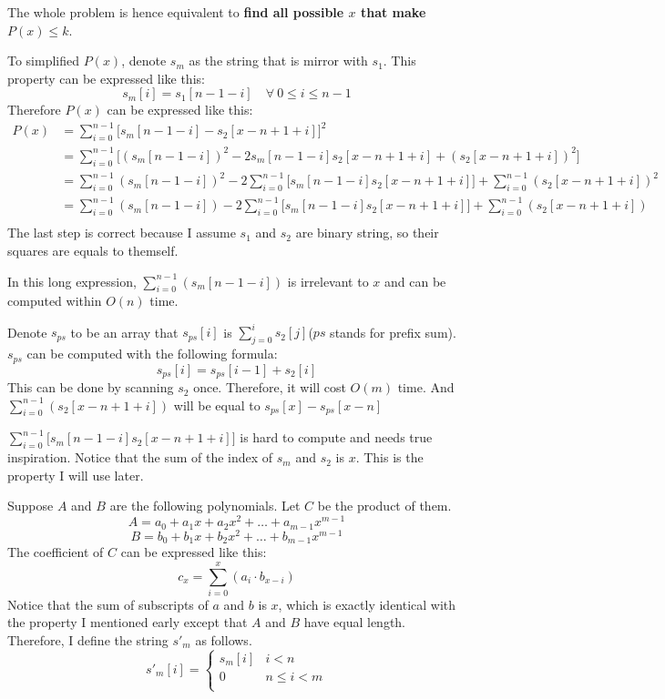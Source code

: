 \documentclass[11pt]{article}
\newenvironment{qparts}{\begin{enumerate}[{(}a{)}]}{\end{enumerate}}
\begin{document}
\begin{qparts}
\begin{enumerate}
		The whole problem is hence equivalent to \textbf{find all possible $x$ that make $P(x) \leq k$}.
		
		To simplified $P(x)$, denote $s_m$ as the string that is mirror with $s_1$. This property can be expressed like this:
		\[
			s_m[i] = s_1[n-1-i] \quad \forall \ 0 \leq i \leq n-1 
		\]
		Therefore $P(x)$ can be expressed like this:
		\begin{align*}
			P(x) &= \sum_{i=0}^{n-1} \bigg [ s_m[n-1-i] - s_2[x-n+1+i]\bigg ]^2 \\
			&= \sum_{i=0}^{n-1} \bigg [ (s_m[n-1-i])^2 - 2s_m[n-1-i]s_2[x-n+1+i] + (s_2[x-n+1+i])^2 \bigg ] \\
			&=  \sum_{i=0}^{n-1}(s_m[n-1-i])^2 - 2\sum_{i=0}^{n-1}\bigg [s_m[n-1-i]s_2[x-n+1+i]\bigg] + \sum_{i=0}^{n-1}(s_2[x-n+1+i])^2  \\
			&=  \sum_{i=0}^{n-1}(s_m[n-1-i]) - 2\sum_{i=0}^{n-1}\bigg [s_m[n-1-i]s_2[x-n+1+i]\bigg] + \sum_{i=0}^{n-1}(s_2[x-n+1+i])  \\
		\end{align*}
		The last step is correct because I assume $s_1$ and $s_2$ are binary string, so their squares are equals to themself. 
		
		In this long expression, $\sum_{i=0}^{n-1}(s_m[n-1-i])$ is irrelevant to $x$ and can be computed within $O(n)$ time.
		
		Denote $s_{ps}$ to be an array that $s_{ps}[i]$ is $\sum_{j=0}^{i}s_2[j]$($ps$ stands for prefix sum). $s_{ps}$ can be computed with the following formula:
		\[
			s_{ps}[i] = s_{ps}[i-1] + s_2[i]
		\]
		This can be done by scanning $s_2$ once. Therefore, it will cost $O(m)$ time. And $\sum_{i=0}^{n-1}(s_2[x-n+1+i])$  will be equal to $s_{ps}[x] - s_{ps}[x-n]$
		
		$\sum_{i=0}^{n-1}\bigg [s_m[n-1-i]s_2[x-n+1+i]\bigg]$ is hard to compute and needs true inspiration. Notice that the sum of the index of $s_m$ and $s_2$ is $x$. This is the property I will use later.
		
		Suppose $A$ and $B$ are the following polynomials. Let $C$ be the product of them.
		\[
			A = a_0 + a_1x + a_2x^2 + \ldots + a_{m-1}x^{m-1}
		\]
		\[
			B = b_0 + b_1x + b_2x^2 + \ldots + b_{m-1}x^{m-1}
		\]
		The coefficient of $C$ can be expressed like this:
		\[
			c_x = \sum_{i=0}^{x}(a_i \cdot b_{x-i})
		\]
		Notice that the sum of subscripts of $a$ and $b$ is $x$, which is exactly identical with the property I mentioned early except that $A$ and $B$ have equal length. Therefore, I define the  string $s\prime_m$ as follows.
		\[
			s\prime_m[i]=
			\begin{cases}
				s_m[i]	& i < n \\
				0		& n \leq i < m \\
			\end{cases}
		\]
		

\end{enumerate}
\end{qparts}
\end{document}
